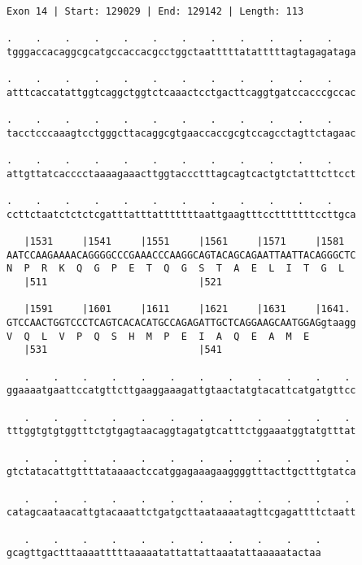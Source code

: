 \documentclass{article}
\begin{document}
\begin{Verbatim}
Exon 14 | Start: 129029 | End: 129142 | Length: 113
 
.    .    .    .    .    .    .    .    .    .    .    .    
tgggaccacaggcgcatgccaccacgcctggctaatttttatatttttagtagagataga
  
.    .    .    .    .    .    .    .    .    .    .    .    
atttcaccatattggtcaggctggtctcaaactcctgacttcaggtgatccacccgccac
  
.    .    .    .    .    .    .    .    .    .    .    .    
tacctcccaaagtcctgggcttacaggcgtgaaccaccgcgtccagcctagttctagaac
  
.    .    .    .    .    .    .    .    .    .    .    .    
attgttatcacccctaaaagaaacttggtaccctttagcagtcactgtctatttcttcct
  
.    .    .    .    .    .    .    .    .    .    .    .    
ccttctaatctctctcgatttatttatttttttaattgaagtttcctttttttccttgca
  
   |1531     |1541     |1551     |1561     |1571     |1581  
AATCCAAGAAAACAGGGGCCCGAAACCCAAGGCAGTACAGCAGAATTAATTACAGGGCTC
N  P  R  K  Q  G  P  E  T  Q  G  S  T  A  E  L  I  T  G  L  
   |511                          |521                       
  
   |1591     |1601     |1611     |1621     |1631     |1641. 
GTCCAACTGGTCCCTCAGTCACACATGCCAGAGATTGCTCAGGAAGCAATGGAGgtaagg
V  Q  L  V  P  Q  S  H  M  P  E  I  A  Q  E  A  M  E        
   |531                          |541                       
  
   .    .    .    .    .    .    .    .    .    .    .    . 
ggaaaatgaattccatgttcttgaaggaaagattgtaactatgtacattcatgatgttcc
  
   .    .    .    .    .    .    .    .    .    .    .    . 
tttggtgtgtggtttctgtgagtaacaggtagatgtcatttctggaaatggtatgtttat
  
   .    .    .    .    .    .    .    .    .    .    .    . 
gtctatacattgttttataaaactccatggagaaagaaggggtttacttgctttgtatca
  
   .    .    .    .    .    .    .    .    .    .    .    . 
catagcaataacattgtacaaattctgatgcttaataaaatagttcgagattttctaatt
  
   .    .    .    .    .    .    .    .    .    .    .
gcagttgactttaaaatttttaaaaatattattattaaatattaaaaatactaa
\end{Verbatim}
\newpage
\end{document}
